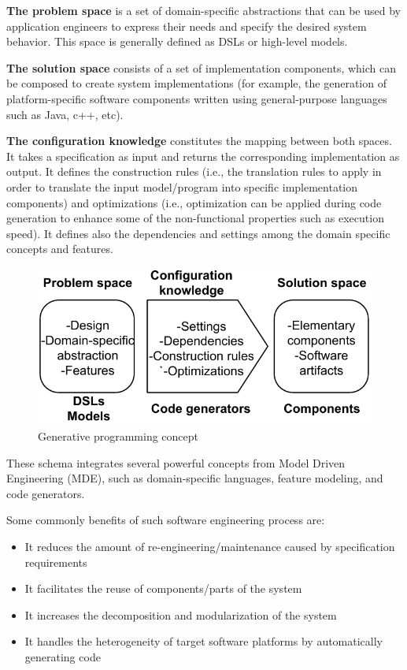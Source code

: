 \textbf{The problem space} is a set of domain-specific abstractions that can be used by application engineers to express their needs and specify the desired system behavior. This space is generally defined  as DSLs or high-level models. 

\textbf{The solution space} consists of a set of implementation components, which can be composed to create system implementations (for example, the generation of platform-specific software components written using general-purpose languages such as Java, c++, etc).

\textbf{The configuration knowledge} constitutes the mapping between both spaces. It takes a specification as input and returns the corresponding implementation as output. It defines the construction rules (i.e., the translation rules to apply in order to translate the input model/program into specific implementation components) and optimizations (i.e., optimization can be applied during code generation to enhance some of the non-functional properties such as execution speed). It defines also the dependencies and settings among the domain specific concepts and features.

\begin{figure}[h]
	\center
	\includegraphics[scale=0.65]{Background/fig/GDM.pdf}
	\caption{Generative programming concept}
\end{figure}
These schema integrates several powerful concepts from Model Driven Engineering (MDE), such as domain-specific languages, feature modeling, and code generators.

Some commonly benefits of such software engineering process are:
\begin{itemize}
\item It reduces the amount of re-engineering/maintenance caused by specification requirements
\item It facilitates the reuse of components/parts of the system
\item It increases the decomposition and modularization of the system
\item It handles the heterogeneity of target software platforms by automatically generating code
\end{itemize}


